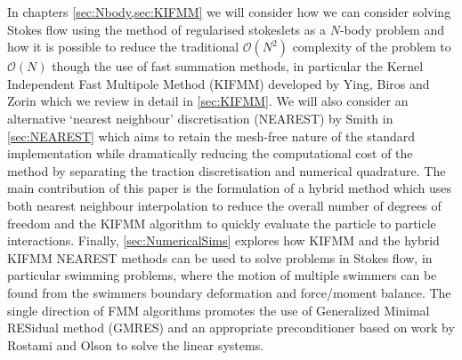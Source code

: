 In chapters \cref{sec:Nbody,sec:KIFMM} we will consider how we can consider solving Stokes flow using the method of regularised stokeslets as a $N$-body problem and how it is possible to reduce the traditional $\mathcal{O}(N^2)$ complexity of the problem to $\mathcal{O}(N)$ though the use of fast summation methods, in particular the Kernel Independent Fast Multipole Method (KIFMM) developed by Ying, Biros and Zorin \cite{Ying2004,Rostami2016Kernel-independentStokeslets,Rostami2019FastBiofluids} which we review in detail in \cref{sec:KIFMM}. We will also consider an alternative `nearest neighbour' discretisation (NEAREST) by Smith \cite{Smith2018AEquation,Gallagher2020,Gallagher2018MeshfreeCells} in \cref{sec:NEAREST} which aims to retain the mesh-free nature  of the standard implementation while dramatically reducing the computational cost of the method by separating the traction discretisation and numerical quadrature. The main contribution of this paper is the formulation of a hybrid method which uses both nearest neighbour interpolation to reduce the overall number of degrees of freedom and the KIFMM algorithm to quickly evaluate the particle to particle interactions. Finally, \cref{sec:NumericalSims} explores how KIFMM and the hybrid KIFMM NEAREST methods can be used to solve problems in Stokes flow, in particular swimming problems, where the motion of multiple swimmers can be found from the swimmers boundary deformation and force/moment balance. The single direction of FMM algorithms promotes the use of Generalized Minimal RESidual method (GMRES) and an appropriate preconditioner based on work by Rostami and Olson \cite{Rostami2019FastBiofluids} to solve the linear systems.